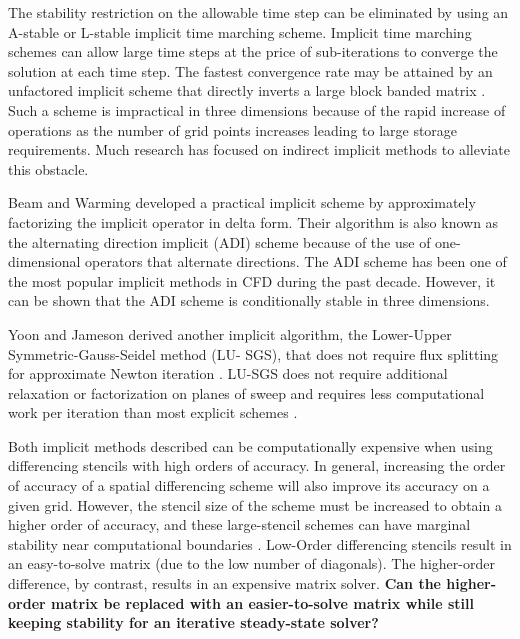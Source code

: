 \documentclass[conf]{new-aiaa}
\begin{document}
The stability restriction on the allowable time step can be eliminated by using an A-stable or L-stable implicit time marching scheme.
Implicit time marching schemes can allow large time steps \cite{A_Stable} at the price of sub-iterations to converge the solution at each time step.
The fastest convergence rate may be attained by an unfactored implicit scheme that directly inverts a large block banded matrix \cite{HixonImplicit}. 
Such a scheme is impractical in three dimensions because of the rapid increase of operations as the number of grid points increases leading to large storage requirements. 
Much research has focused on indirect implicit methods to alleviate this obstacle.


Beam and Warming \cite{Beam} developed a practical implicit scheme by approximately factorizing the implicit operator in delta form. 
Their algorithm is also known as the alternating direction implicit (ADI) scheme because of the use of one-dimensional operators that alternate directions. 
The ADI scheme has been one of the most popular implicit methods in CFD during the past decade. 
However, it can be shown that the ADI scheme is conditionally stable in three dimensions. 

Yoon and Jameson derived another implicit algorithm, the Lower-Upper Symmetric-Gauss-Seidel method (LU- SGS), that does not require flux splitting for approximate Newton iteration \cite{LUSGS}. 
LU-SGS does not require additional relaxation or factorization on planes of sweep and requires less computational work per iteration than most explicit schemes \cite{YoonLUSGS}.

Both implicit methods described can be computationally expensive when using differencing stencils with high orders of accuracy. 
In general, increasing the order of accuracy of a spatial differencing scheme will also improve its accuracy on a given grid. 
However, the stencil size of the scheme must be increased to obtain a higher order of accuracy, and these large-stencil schemes can have marginal stability near computational boundaries \cite{RDRP}. 
Low-Order differencing stencils result in an easy-to-solve matrix (due to the low number of diagonals).
The higher-order difference, by contrast, results in an expensive matrix solver. 
\textbf{Can the higher-order matrix be replaced with an easier-to-solve matrix while still keeping stability for an iterative steady-state solver?}
\end{document}
